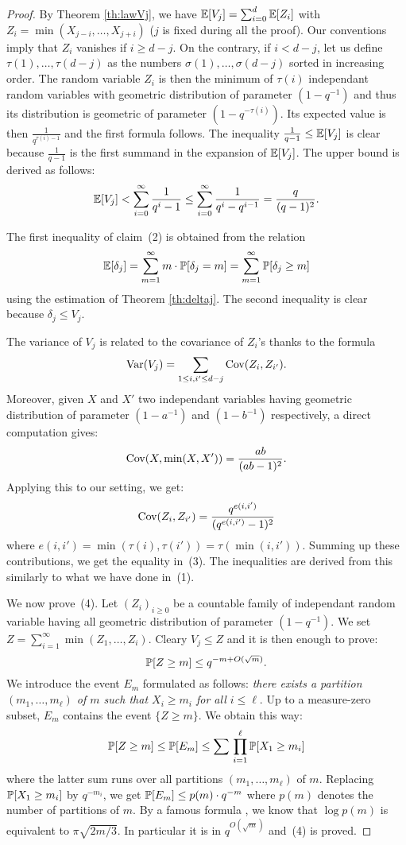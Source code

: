 \documentclass{article}
\begin{document}
\begin{proof}
By Theorem \ref{th:lawVj}, we have $\E[V_j] =
\sum_{i=0}^d \E[Z_i]$ with $Z_i = \min(X_{j-i}, \ldots, X_{j+i})$ ($j$ 
is fixed during all the proof). Our conventions imply that $Z_i$ 
vanishes if $i \geq d-j$. On the contrary, if $i < d-j$, let us define 
$\tau(1), \ldots, \tau(d-j)$ as the numbers $\sigma(1), \ldots, 
\sigma(d-j)$ sorted in increasing order. The random variable $Z_i$ 
is then the minimum of $\tau(i)$ independant random variables with 
geometric distribution of parameter $(1 - q^{-1})$ and thus its 
distribution is geometric of parameter $(1 - q^{-\tau(i)})$.
Its expected value is then $\frac 1 {q^{\tau(i) - 1}}$ and the first
formula follows. The inequality $\frac 1 {q-1} \leq \E[V_j]$ is clear
because $\frac 1 {q-1}$ is the first summand in the expansion of
$\E[V_j]$. The upper bound is derived as follows:
$$\E[V_j] < \sum_{i=0}^\infty \frac 1{q^i - 1}
\leq \sum_{i=0}^\infty \frac 1{q^i - q^{i-1}} = \frac q {(q-1)^2}.$$

The first inequality of claim~(2) is obtained from the relation 
$$\E[\delta_j] 
= \sum_{m=1}^\infty m \cdot \P[\delta_j = m]
= \sum_{m=1}^\infty \P[\delta_j \geq m]$$ 
using the estimation of Theorem \ref{th:deltaj}. The second inequality 
is clear because $\delta_j \leq V_j$.

The variance of $V_j$ is related to the covariance of $Z_i$'s thanks to 
the formula
$$\Var(V_j) = \sum_{1 \leq i,i' \leq d-j} \Cov(Z_i, Z_{i'}).$$
Moreover, given $X$ and $X'$ two independant variables having geometric
distribution of parameter $(1 - a^{-1})$ and $(1 - b^{-1})$ respectively,
a direct computation gives:
$$\Cov(X, \min(X,X')) = \frac{ab}{(ab-1)^2}.$$
Applying this to our setting, we get:
$$\Cov(Z_i, Z_{i'}) = \frac{q^{e(i,i')}}{(q^{e(i,i')}-1)^2}$$
where $e(i,i') = \min(\tau(i), \tau(i')) = \tau(\min(i,i'))$. Summing
up these contributions, we get the equality in~(3). The inequalities
are derived from this similarly to what we have done in~(1).

We now prove~(4). Let $(Z_i)_{i \geq 0}$ be a countable family 
of independant random variable having all geometric distribution of 
parameter $(1 - q^{-1})$. We set $Z = \sum_{i=1}^\infty \min(Z_1, \ldots, 
Z_i)$. Cleary $V_j \leq Z$ and it is then enough to prove:
$$\P[Z \geq m] \leq q^{-m + O(\sqrt m)}.$$
We introduce the event $E_m$ formulated as follows:
\emph{there exists a partition $(m_1, \ldots, m_\ell)$ of $m$ such that $X_i 
\geq m_i$ for all $i \leq \ell$}.
Up to a measure-zero subset, $E_m$ contains the event $\{ Z \geq m\}$.
We obtain this way:
$$\P[Z \geq m] \leq \P[E_m] \leq
\sum \, \prod_{i=1}^\ell \P[X_1 \geq m_i]$$
where the latter sum runs over all partitions $(m_1, \ldots, m_\ell)$ 
of $m$. Replacing $\P[X_1 \geq m_i]$ by $q^{-m_i}$, we get
$\P[E_m] \leq p(m) \cdot q^{-m}$
where $p(m)$ denotes the number of partitions of $m$. By a famous 
formula \cite{andrews}, we know that $\log p(m)$ is equivalent to $\pi 
\sqrt{2m/3}$. In particular it is in $q^{O(\sqrt m)}$ and~(4) is proved.


\end{proof}
\end{document}
